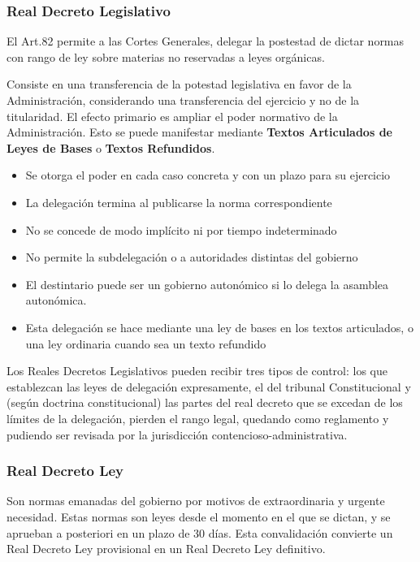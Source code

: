     \subsubsection{Real Decreto Legislativo}
        El Art.82 permite a las Cortes Generales, delegar la postestad de dictar normas con rango de ley sobre materias no reservadas a leyes orgánicas.

        Consiste en una transferencia de la potestad legislativa en favor de la Administración, considerando una transferencia del ejercicio y no de la titularidad. El efecto primario es ampliar el poder normativo de la Administración. Esto se puede manifestar mediante \textbf{Textos Articulados de Leyes de Bases} o \textbf{Textos Refundidos}.

        \begin{itemize}
            \item Se otorga el poder en cada caso concreta y con un plazo para su ejercicio
            \item La delegación termina al publicarse la norma correspondiente
            \item No se concede de modo implícito ni por tiempo indeterminado
            \item No permite la subdelegación o a autoridades distintas del gobierno
            \item El destintario puede ser un gobierno autonómico si lo delega la asamblea autonómica.
            \item Esta delegación se hace mediante una ley de bases en los textos articulados, o una ley ordinaria cuando sea un texto refundido
        \end{itemize}
        Los Reales Decretos Legislativos pueden recibir tres tipos de control: los que establezcan las leyes de delegación expresamente, el del tribunal Constitucional y (según doctrina constitucional) las partes del real decreto que se excedan de los límites de la delegación, pierden el rango legal, quedando como reglamento y pudiendo ser revisada por la jurisdicción contencioso-administrativa.

    \subsubsection{Real Decreto Ley}
        Son normas emanadas del gobierno por motivos de extraordinaria y urgente necesidad. Estas normas son leyes desde el momento en el que se dictan, y se aprueban a posteriori en un plazo de 30 días. Esta convalidación convierte un Real Decreto Ley provisional en un Real Decreto Ley definitivo.

